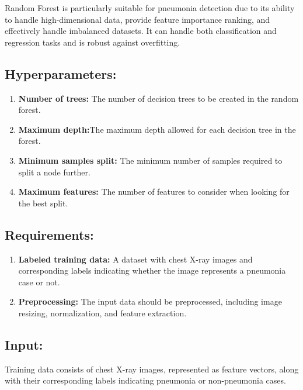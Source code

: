 Random Forest is particularly suitable for pneumonia detection due to its ability to handle high-dimensional data, provide feature importance ranking, and effectively handle imbalanced datasets. It can handle both classification and regression tasks and is robust against overfitting.\\


\subsection{Hyperparameters:}

\begin{enumerate}
\item \textbf{Number of trees:} The number of decision trees to be created in the random forest.\\
\item \textbf{Maximum depth:}The maximum depth allowed for each decision tree in the forest.\\
\item \textbf{Minimum samples split:} The minimum number of samples required to split a node further.\\
\item \textbf{Maximum features:} The number of features to consider when looking for the best split.\\
\end{enumerate}

\subsection{Requirements:}
\begin{enumerate}
\item \textbf{Labeled training data:} A dataset with chest X-ray images and corresponding labels indicating whether the image represents a pneumonia case or not.\\
\item \textbf{Preprocessing:} The input data should be preprocessed, including image resizing, normalization, and feature extraction.\\
\end{enumerate}

\subsection{Input:}
Training data consists of chest X-ray images, represented as feature vectors, along with their corresponding labels indicating pneumonia or non-pneumonia cases.\\

